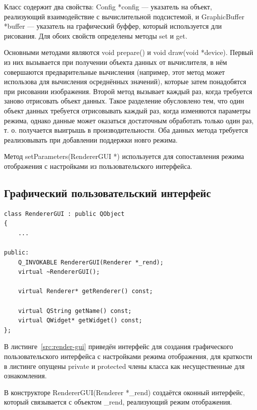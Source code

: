 \documentclass[a4paper,12pt]{extarticle}
\begin{document}
Класс содержит два свойства: \textsf{Config *config} --- указатель на объект, реализующий взаимодействие с вычислительной подсистемой, и \textsf{GraphicBuffer *buffer} --- указатель на графический буффер, который используется дли рисования. Для обоих свойств определены методы \textsf{set} и \textsf{get}.

Основными методами являются \textsf{void prepare()} и \textsf{void draw(void *device)}. Первый из них вызывается при получении объекта данных от вычислителя, в нём совершаются предварительные вычисления (например, этот метод может использова для вычисления осреднённых значений), которые затем понадобятся при рисовании изображения. Второй метод вызывает каждый раз, когда требуется заново отрисовать объект данных. Такое разделение обусловлено тем, что один объект данных требуется отрисовывать каждый раз, когда изменяются параметры режима, однако данные может оказаться достаточным обработать только один раз, т. о. получается выигрышь в производительности. Оба данных метода требуется реализовывать при добавлении поддержки новго режима.

Метод \textsf{setParameters(RendererGUI *)} используется для сопоставления режима отображения с настройками из пользовательского интерфейса.

\subsection{Графический пользовательский интерфейс}

\begin{lstlisting}[label=src:render-gui,caption=Реализация графического интерфейса для настроек режима отображения]
class RendererGUI : public QObject
{
    ...

public:
    Q_INVOKABLE RendererGUI(Renderer *_rend);
    virtual ~RendererGUI();

    virtual Renderer* getRenderer() const;

    virtual QString getName() const;
    virtual QWidget* getWidget() const;
};
\end{lstlisting}

В листинге~\ref{src:render-gui} приведён интерфейс для создания графического пользовательского интерфейса с настройками режима отображения, для краткости в листинге опущены \textsf{private} и \textsf{protected} члены класса как несущественные для ознакомления.

В конструкторе \textsf{RendererGUI(Renderer *\_rend)} создаётся оконный интерфейс, который связывается с объектом \textsf{\_rend}, реализующий режим отображения.
\end{document}
